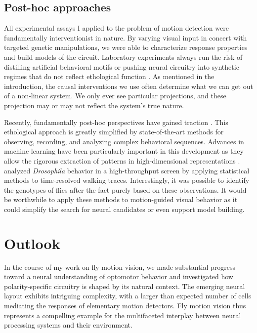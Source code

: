 \subsection{Post-hoc approaches}
All experimental assays I applied to the problem of motion detection were fundamentally interventionist in nature. By varying visual input in concert with targeted genetic manipulations, we were able to characterize response properties and build models of the circuit. Laboratory experiments always run the risk of distilling artificial behavioral motifs or pushing neural circuitry into synthetic regimes that do not reflect ethological function \citep{Krakauer:2017aa}. As mentioned in the introduction, the causal interventions we use often determine what we can get out of a non-linear system. We only ever see particular projections, and these projection may or may not reflect the system's true nature.

Recently, fundamentally post-hoc perspectives have gained traction \citep{GomezMarin:2014aa}. This ethological approach is greatly simplified by state-of-the-art methods for observing, recording, and analyzing complex behavioral sequences. Advances in machine learning have been particularly important in this development as they allow the rigorous extraction of patterns in high-dimensional representations \citep[for instance, see][]{Kabra:2013aa}. \citet{Branson:2009aa} analyzed \textit{Drosophila} behavior in a high-throughput screen by applying statistical methods to time-resolved walking traces. Interestingly, it was possible to identify the genotypes of flies after the fact purely based on these observations. It would be worthwhile to apply these methods to motion-guided visual behavior as it could simplify the search for neural candidates or even support model building.

\section{Outlook}
In the course of my work on fly motion vision, we made substantial progress toward a neural understanding of optomotor behavior and investigated how polarity-specific circuitry is shaped by its natural context. The emerging neural layout exhibits intriguing complexity, with a larger than expected number of cells mediating the responses of elementary motion detectors. Fly motion vision thus represents a compelling example for the multifaceted interplay between neural processing systems and their environment.

